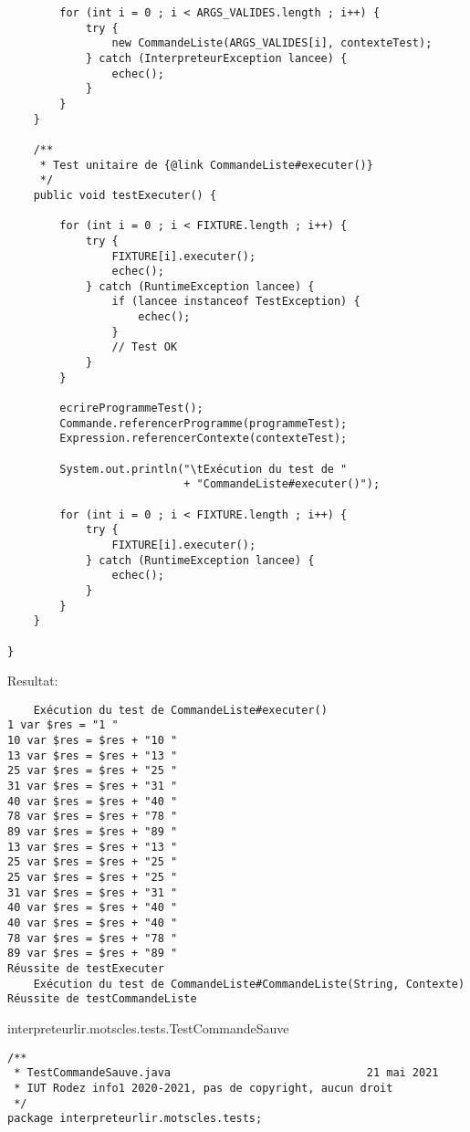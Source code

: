 \begin{enum}
\begin{verbatim}
        for (int i = 0 ; i < ARGS_VALIDES.length ; i++) {
            try {
                new CommandeListe(ARGS_VALIDES[i], contexteTest);
            } catch (InterpreteurException lancee) {
                echec();
            }
        }
    }
    
    /** 
     * Test unitaire de {@link CommandeListe#executer()}
     */
    public void testExecuter() {
        
        for (int i = 0 ; i < FIXTURE.length ; i++) {
            try {
                FIXTURE[i].executer();
                echec();
            } catch (RuntimeException lancee) {
                if (lancee instanceof TestException) {
                    echec();
                }
                // Test OK
            }
        }

        ecrireProgrammeTest();
        Commande.referencerProgramme(programmeTest);
        Expression.referencerContexte(contexteTest);
        
        System.out.println("\tExécution du test de "
                           + "CommandeListe#executer()");
        
        for (int i = 0 ; i < FIXTURE.length ; i++) {
            try {
                FIXTURE[i].executer();
            } catch (RuntimeException lancee) {
                echec();
            }
        }
    }
     
}
\end{verbatim}
Resultat:
\begin{verbatim}
    Exécution du test de CommandeListe#executer()
1 var $res = "1 "
10 var $res = $res + "10 "
13 var $res = $res + "13 "
25 var $res = $res + "25 "
31 var $res = $res + "31 "
40 var $res = $res + "40 "
78 var $res = $res + "78 "
89 var $res = $res + "89 "
13 var $res = $res + "13 "
25 var $res = $res + "25 "
25 var $res = $res + "25 "
31 var $res = $res + "31 "
40 var $res = $res + "40 "
40 var $res = $res + "40 "
78 var $res = $res + "78 "
89 var $res = $res + "89 "
Réussite de testExecuter
    Exécution du test de CommandeListe#CommandeListe(String, Contexte)
Réussite de testCommandeListe
\end{verbatim}

    \item interpreteurlir.motscles.tests.TestCommandeSauve
\begin{verbatim}
/**
 * TestCommandeSauve.java                              21 mai 2021
 * IUT Rodez info1 2020-2021, pas de copyright, aucun droit
 */
package interpreteurlir.motscles.tests;


\end{verbatim}
\end{enum}
